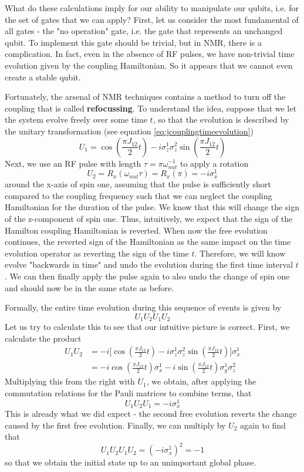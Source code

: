 \documentclass[a4paper, draft]{article}
\theoremstyle{own}
\theoremstyle{remark}
\begin{document}
What do these calculations imply for our ability to manipulate our qubits, i.e. for the set of gates that we can apply? First, let us consider the most fundamental of all gates - the "no operation" gate, i.e. the gate that represents an unchanged qubit. To implement this gate should be trivial, but in NMR, there is a complication. In fact, even in the absence of RF pulses, we have non-trivial time evolution given by the coupling Hamiltonian. So it appears that we cannot even create a stable qubit.

Fortunately, the arsenal of NMR techniques contains a method to turn off the coupling that is called {\bf refocussing}. To understand the idea, suppose that we let the system evolve freely over some time $t$, so that the evolution is described by the unitary transformation (see equation \eqref{eq:jcouplingtimeevolution})
$$
U_1 = \cos (\frac{\pi J_{12}}{2} t) -i \sigma_z^1 \sigma_z^2 \sin (\frac{\pi J_{12}}{2}  t)
$$
Next, we use an RF pulse with length $\tau = \pi \omega_{nut}^{-1}$ to apply a rotation
$$
U_2 = R_x(\omega_{nut} \tau) = R_x(\pi) = - i \sigma_x^1
$$
around the x-axis of spin one, assuming that the pulse is sufficiently short compared to the coupling frequency such that we can neglect the coupling Hamiltonian for the duration of the pulse. We know that this will change the sign of the z-component of spin one. Thus, intuitively, we expect that the sign of the Hamilton coupling Hamiltonian is reverted. When now the free evolution continues, the reverted sign of the Hamiltonian as the same impact on the time evolution operator as reverting the sign of the time $t$. Therefore, we will know evolve "backwards in time" and undo the evolution during the first time interval $t$. We can then finally apply the pulse again to also undo the change of spin one and should now be in the same state as before. 

Formally, the entire time evolution during this sequence of events is given by
$$
U_1 U_2 U_1 U_2
$$
Let us try to calculate this to see that our intuitive picture is correct. First, we calculate the product 
\begin{align*}
U_1 U_2 &= -i \big[ \cos (\frac{\pi J_{12}}{2} t) -i \sigma_z^1 \sigma_z^2 \sin (\frac{\pi J_{12}}{2}  t) \big] \sigma_x^1 \\
&= -i \cos (\frac{\pi J_{12}}{2} t) \sigma_x^1 - i \sin (\frac{\pi J_{12}}{2}  t) \sigma_y^1 \sigma_z^2
\end{align*}
Multiplying this from the right with $U_1$, we obtain, after applying the commutation relations for the Pauli matrices to combine terms, that
$$
U_1 U_2 U_1 = -i \sigma_x^1
$$
This is already what we did expect - the second free evolution reverts the change caused by the first free evolution. Finally, we can multiply by $U_2$ again to find that
$$
U_1 U_2 U_1 U_2 = (-i \sigma_x^1)^2 = -1
$$
so that we obtain the initial state up to an unimportant global phase. 
\end{document}
